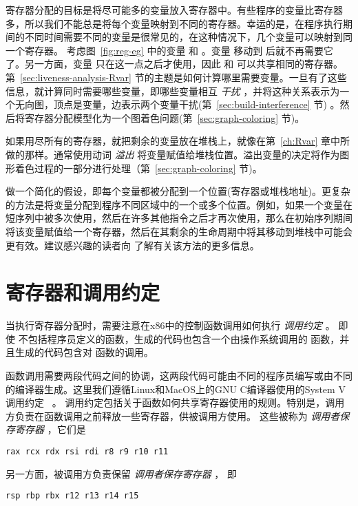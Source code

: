 \documentclass[11pt]{book}
\begin{document}
寄存器分配的目标是将尽可能多的变量放入寄存器中。有些程序的变量比寄存器多，所以我们不能总是将每个变量映射到不同的寄存器。幸运的是，在程序执行期间的不同时间需要不同的变量是很常见的，在这种情况下，几个变量可以映射到同一个寄存器。
考虑图~\ref{fig:reg-eg} 中的变量  和  。变量  移动到  后就不再需要它了。另一方面，变量  只在这一点之后才使用，因此  和  可以共享相同的寄存器。第~\ref{sec:liveness-analysis-Rvar} 节的主题是如何计算哪里需要变量。一旦有了这些信息，就计算同时需要哪些变量，即哪些变量相互
\emph{干扰} ，并将这种关系表示为一个无向图，顶点是变量，边表示两个变量干扰(第~\ref{sec:build-interference} 节) 。然后将寄存器分配模型化为一个图着色问题(第~\ref{sec:graph-coloring} 节)。

如果用尽所有的寄存器，就把剩余的变量放在堆栈上，就像在第~\ref{ch:Rvar} 章中所做的那样。通常使用动词 \emph{溢出}
将变量赋值给堆栈位置。溢出变量的决定将作为图形着色过程的一部分进行处理（第~\ref{sec:graph-coloring} 节)。

做一个简化的假设，即每个变量都被分配到一个位置(寄存器或堆栈地址)。更复杂的方法是将变量分配到程序不同区域中的一个或多个位置。例如，如果一个变量在短序列中被多次使用，然后在许多其他指令之后才再次使用，那么在初始序列期间将该变量赋值给一个寄存器，然后在其剩余的生命周期中将其移动到堆栈中可能会更有效。建议感兴趣的读者向
\citet{Cooper:2011aa} 了解有关该方法的更多信息。


\section{寄存器和调用约定}
\label{sec:calling-conventions}

当执行寄存器分配时，需要注意在x86中的控制函数调用如何执行
\emph{调用约定}  。
%
即使 \LangVar{} 不包括程序员定义的函数，生成的代码也包含一个由操作系统调用的  函数，并且生成的代码包含对 函数的调用。

函数调用需要两段代码之间的协调，这两段代码可能由不同的程序员编写或由不同的编译器生成。这里我们遵循Linux和MacOS上的GNU C编译器使用的System V调用约定~\citep{Bryant:2005aa,Matz:2013aa} 。
%
调用约定包括关于函数如何共享寄存器使用的规则。特别是，调用方负责在函数调用之前释放一些寄存器，供被调用方使用。
这些被称为 \emph{调用者保存寄存器}
，它们是
\begin{lstlisting}
rax rcx rdx rsi rdi r8 r9 r10 r11
\end{lstlisting}
另一方面，被调用方负责保留 \emph{调用者保存寄存器} ，
即
\begin{lstlisting}
rsp rbp rbx r12 r13 r14 r15
\end{lstlisting}
\end{document}
